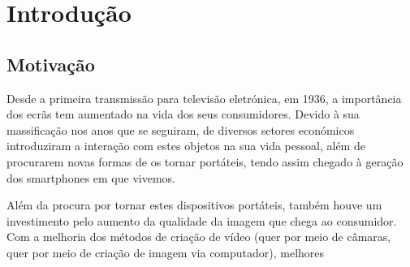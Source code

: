 \cleardoublepage
{}
\chapter{Introdução}

\section{Motivação}

Desde a primeira transmissão para televisão eletrónica, em 1936, a importância dos ecrãs tem aumentado na vida dos seus consumidores. Devido à sua massificação nos anos que se seguiram,  de diversos setores económicos introduziram a interação com estes objetos na sua vida pessoal, além de procurarem novas formas de os tornar portáteis, tendo assim chegado à geração dos smartphones em que vivemos.

Além da procura por tornar estes dispositivos portáteis, também houve um investimento pelo aumento da qualidade da imagem que chega ao consumidor. Com a melhoria dos métodos de criação de vídeo (quer por meio de câmaras, quer por meio de criação de imagem via computador), melhores
